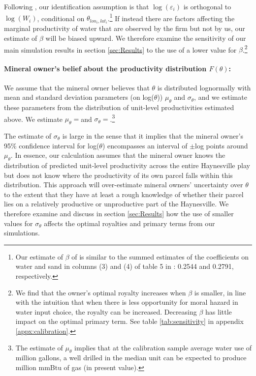 \documentclass[12pt]{article}
\begin{document}
Following \citet{bib:covert}, our identification assumption is that $\log(\varepsilon_i)$ is orthogonal to $\log(W_i)$, conditional on $\theta_{lon_i,lat_i}$.\footnote{Our estimate of $\beta$ of is similar to the summed estimates of the coefficients on water and sand in columns (3) and (4) of table 5 in \citet{bib:covert}: 0.2544 and 0.2791, respectively.} If instead there are factors affecting the marginal productivity of water that are observed by the firm but not by us, our estimate of $\beta$ will be biased upward. We therefore examine the sensitivity of our main simulation results in section \ref{sec:Results} to the use of a lower value for $\beta$.\footnote{We find that the owner's optimal royalty increases when $\beta$ is smaller, in line with the intuition that when there is less opportunity for moral hazard in water input choice, the royalty can be increased. Decreasing $\beta$ has little impact on the optimal primary term. See table \ref{tab:sensitivity} in appendix \ref{appx:calibration}.}



\paragraph{Mineral owner's belief about the productivity distribution $F(\theta)$:}

We assume that the mineral owner believes that $\theta$ is distributed lognormally with mean and standard deviation parameters (on log($\theta$)) $\mu_{\theta}$ and $\sigma_{\theta}$, and we estimate these parameters from the distribution of unit-level productivities estimated above. We estimate $\mu_{\theta} = $and $\sigma_{\theta} = $\unskip.\footnote{The estimate of $\mu_{\theta}$ implies that at the calibration sample average water use of million gallons, a well drilled in the median unit can be expected to produce million mmBtu of gas (in present value).} 

The estimate of $\sigma_{\theta}$ is large in the sense that it implies that the mineral owner's 95\% confidence interval for log($\theta$) encompasses an interval of $\pm$log points around $\mu_{\theta}$. In essence, our calculation assumes that the mineral owner knows the distribution of predicted unit-level productivity across the entire Haynesville play but does not know where the productivity of its own parcel falls within this distribution. This approach will over-estimate mineral owners' uncertainty over $\theta$ to the extent that they have at least a rough knowledge of whether their parcel lies on a relatively productive or unproductive part of the Haynesville. We therefore examine and discuss in section \ref{sec:Results} how the use of smaller values for $\sigma_\theta$ affects the optimal royalties and primary terms from our simulations.
\end{document}

